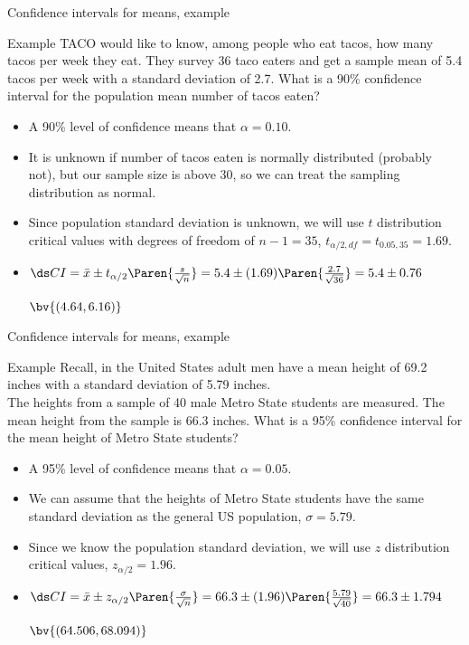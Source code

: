 \documentclass[xcolor=table, handout]{beamer}
\begin{document}
\begin{frame}{Confidence intervals for means, example}
\begin{exampleblock}{Example}
TACO would like to know, among people who eat tacos, how many tacos per week they eat. They survey 36 taco eaters and get a sample mean of 5.4 tacos per week with a standard deviation of 2.7. What is a 90\% confidence interval for the population mean number of tacos eaten?
\begin{itemize}
\pause\item A 90\% level of confidence means that $\alpha = 0.10$.
\pause\item It is unknown if number of tacos eaten is normally distributed (probably not), but our sample size is above 30, so we can treat the sampling distribution as normal.
\pause\item Since population standard deviation is unknown, we will use $t$ distribution critical values with degrees of freedom of $n-1=35$, $t_{\alpha/2, df}= t_{0.05,35} = 1.69$.
\pause\item $\ds CI = \bar x \pm t_{\alpha/2}\Paren{\frac s {\sqrt{n}}} = 5.4 \pm (1.69) \Paren{\frac {2.7}{\sqrt{36}}} = 5.4 \pm 0.76$\\
\pause\smallskip
{\large $\bv{(4.64, 6.16)}$ \par}
\end{itemize}
\end{exampleblock}
\end{frame}

\begin{frame}{Confidence intervals for means, example}
\begin{exampleblock}{Example}
Recall, in the United States adult men have a mean height of 69.2 inches with a standard deviation of 5.79 inches.\\
\medskip
The heights from a sample of 40 male Metro State students are measured. The mean height from the sample is 66.3 inches. What is a 95\% confidence interval for the mean height of Metro State students?
\begin{itemize}
\pause\item A 95\% level of confidence means that $\alpha = 0.05$.
\pause\item We can assume that the heights of Metro State students have the same standard deviation as the general US population, $\sigma = 5.79$.
\pause\item Since we know the population standard deviation, we will use $z$ distribution critical values, $z_{\alpha/2} = 1.96$.
\pause\item $\ds CI = \bar x \pm z_{\alpha/2}\Paren{\frac \sigma {\sqrt{n}}} = 66.3 \pm (1.96) \Paren{\frac {5.79}{\sqrt{40}}} = 66.3 \pm 1.794$\\
\pause\smallskip
{\large $\bv{(64.506, 68.094)}$ \par}
\end{itemize}
\end{exampleblock}
\end{frame}
\end{document}
